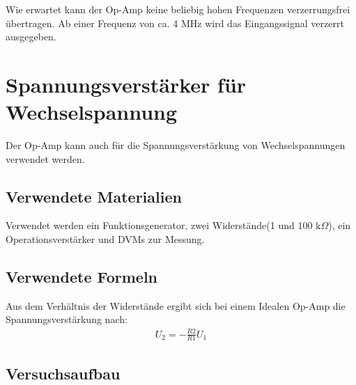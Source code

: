 \documentclass[12pt,a4paper]{article}
\begin{document}
Wie erwartet kann der Op-Amp keine beliebig hohen Frequenzen verzerrungsfrei übertragen. Ab einer Frequenz von ca. 4 MHz wird das Eingangssignal verzerrt ausgegeben.

\section{Spannungsverstärker für Wechselspannung}
Der Op-Amp kann auch für die Spannungsverstärkung von Wechselspannungen verwendet werden.
\subsection{Verwendete Materialien}

Verwendet werden ein Funktionsgenerator, zwei Widerstände(1 und 100 k$\Omega$), ein Operationsverstärker und DVMs zur Messung.

\subsection{Verwendete Formeln}
Aus dem Verhältnis der Widerstände ergibt sich bei einem Idealen Op-Amp die Spannungsverstärkung nach:
\begin{align}
U_2 = -\frac{R2}{R1}U_1
\end{align}
\subsection{Versuchsaufbau}
\end{document}
